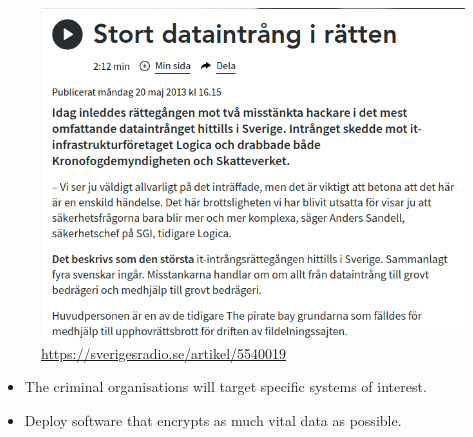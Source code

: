\begin{frame}
  \begin{figure}
    \includegraphics[width=\columnwidth]{figs/skatteverket-hack.png}
    \caption{\url{https://sverigesradio.se/artikel/5540019}}
  \end{figure}
\end{frame}

\begin{frame}
  \begin{example}
    \begin{itemize}
      \item The criminal organisations will target specific systems of interest.
    \end{itemize}
  \end{example}

  \begin{example}[Randomware]
    \begin{itemize}
      \item Deploy software that encrypts as much vital data as possible.
    \end{itemize}
  \end{example}
\end{frame}

